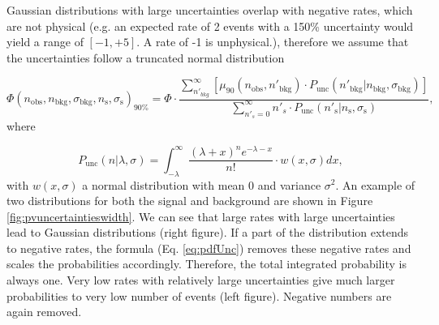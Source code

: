 Gaussian distributions with large uncertainties overlap with negative rates, which are not physical (e.g. an expected rate of 2 events with a 150\% uncertainty would yield a range of $\left[-1,+5\right]$. A rate of -1 is unphysical.), therefore we assume that the uncertainties follow a truncated normal distribution 

\begin{equation}
\label{eq:finalUL}
\Phi(n_\textrm{obs}, n_\textrm{bkg}, \sigma_{\textrm{bkg}}, n_\textrm{s}, \sigma_{\textrm{s}} )_{90\%} = \Phi \cdot \frac{\sum^\infty_{n'_{bkg}} \left[ \mu_{90}\left(n_\textrm{obs},n'_\textrm{bkg} \right) \cdot P_\textrm{unc} \left(n'_\textrm{bkg}|n_\textrm{bkg},\sigma_{\textrm{bkg}}\right) \right]}{\sum^\infty_{n'_s = 0} n'_s \cdot P_\textrm{unc}\left(n'_\textrm{s} | n_\textrm{s}, \sigma_{\textrm{s}}\right)},
\end{equation}
where

\begin{equation}
\label{eq:pdfUnc}
P_\textrm{unc}\left(n|\lambda, \sigma \right) = \int^\infty_{-\lambda} \frac{\left(\lambda + x\right)^n e^{-\lambda-x}}{n!} \cdot w(x,\sigma)dx,
\end{equation}
with $w(x,\sigma)$ a normal distribution with mean 0 and variance $\sigma^2$. An example of two distributions for both the signal and background are shown in Figure \ref{fig:pvuncertaintieswidth}. We can see that large rates with large uncertainties lead to Gaussian distributions (right figure). If a part of the distribution extends to negative rates, the formula (Eq. \ref{eq:pdfUnc}) removes these negative rates and scales the probabilities accordingly. Therefore, the total integrated probability is always one. Very low rates with relatively large uncertainties give much larger probabilities to very low number of events (left figure). Negative numbers are again removed.

